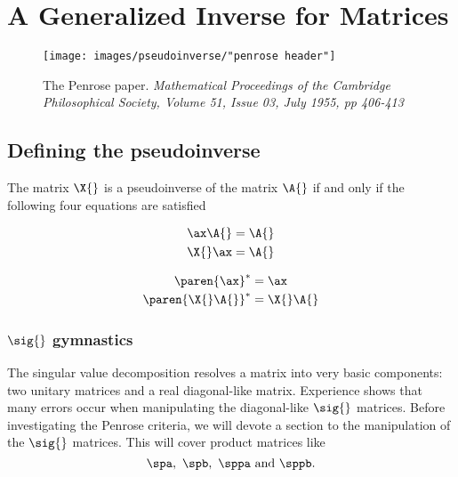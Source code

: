 \section{A Generalized Inverse for Matrices}

\begin{figure}[htbp] %
   \centering
   \texttt{[image: images/pseudoinverse/"penrose header"]} 
   \caption[The Penrose paper]{The Penrose paper. \it{Mathematical Proceedings of the Cambridge Philosophical Society}, Volume 51, Issue	03, July 1955, pp 406-413}
   \label{fig:penrose header}
\end{figure}

\subsection{Defining the pseudoinverse}
The matrix $\X{}$ is a pseudoinverse of the matrix $\A{}$ if and only if the following four equations are satisfied

\begin{equation}
  \begin{split}
    \ax \A{} &= \A{} \\
    \X{} \ax &= \A{}
  \end{split}
  \label{eq:penrose:a}
\end{equation}

\begin{equation}
  \begin{split}
    \paren{\ax}^{*} &= \ax \\
    \paren{\X{} \A{}}^{*} &= \X{} \A{}
  \end{split}
  \label{eq:penrose:b}
\end{equation}

\subsubsection{$\sig{}$ gymnastics}
The singular value decomposition resolves a matrix into very basic components: two unitary matrices and a real diagonal-like matrix. Experience shows that many errors occur when manipulating the diagonal-like $\sig{}$ matrices. Before investigating the Penrose criteria, we will devote a section to the manipulation of the $\sig{}$ matrices. This will cover product matrices like
$$
 \spa,\ \spb,\ \sppa \text{ and } \sppb.
$$
  

